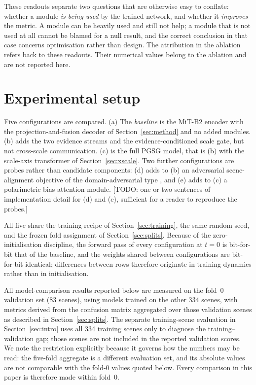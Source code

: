 \documentclass[preprint,12pt,authoryear]{elsarticle}
\begin{document}
These readouts separate two questions that are otherwise easy to conflate:
whether a module \emph{is being used} by the trained network, and whether it
\emph{improves} the metric. A module can be heavily used and still not help; a
module that is not used at all cannot be blamed for a null result, and the
correct conclusion in that case concerns optimisation rather than design. The
attribution in the ablation refers back to these readouts. Their numerical
values belong to the ablation and are not reported here.


\section{Experimental setup}
\label{sec:experiments}

Five configurations are compared. (a) The \emph{baseline} is the MiT-B2 encoder
with the projection-and-fusion decoder of Section~\ref{sec:method} and no added
modules. (b) adds the two evidence streams and the evidence-conditioned scale
gate, but not cross-scale communication. (c) is the full PGSG model, that is
(b) with the scale-axis transformer of Section~\ref{sec:xscale}. Two further
configurations are probes rather than candidate components: (d) adds to (b) an
adversarial scene-alignment objective of the domain-adversarial type
\citep{ganin2016dann}, and (e) adds to (c) a polarimetric bias attention module.
[TODO: one or two sentences of implementation detail for (d) and (e), sufficient
for a reader to reproduce the probes.]

All five share the training recipe of Section~\ref{sec:training}, the same
random seed, and the frozen fold assignment of Section~\ref{sec:splits}. Because
of the zero-initialisation discipline, the forward pass of every configuration
at $t=0$ is bit-for-bit that of the baseline, and the weights shared between
configurations are bit-for-bit identical; differences between rows therefore
originate in training dynamics rather than in initialisation.

All model-comparison results reported below are measured on the fold~0
validation set (83 scenes), using models trained on the other 334 scenes,
with metrics derived from the confusion matrix aggregated over those
validation scenes as described in Section~\ref{sec:splits}. The separate
training-scene evaluation in Section~\ref{sec:intro} uses all 334 training
scenes only to diagnose the training--validation gap; those scenes are not
included in the reported validation scores. We note the restriction explicitly
because it governs how the numbers may be read: the five-fold aggregate is a
different evaluation set, and its absolute values are not comparable with the
fold-0 values quoted below. Every comparison in this paper is therefore made
within fold~0.
\end{document}
